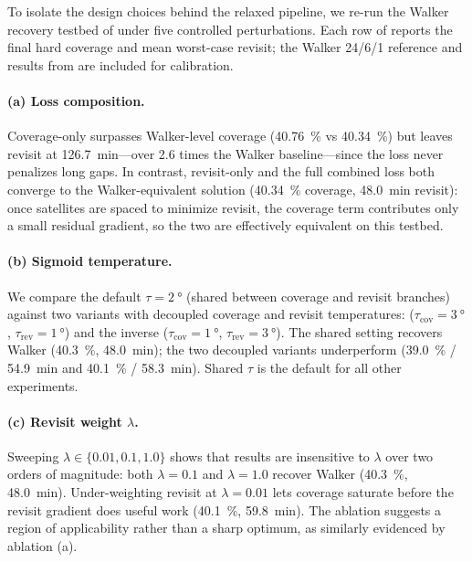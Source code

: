To isolate the design choices behind the relaxed pipeline, we re-run the Walker recovery testbed of  under five controlled perturbations. Each row of  reports the final hard coverage and mean worst-case revisit; the Walker 24/6/1 reference and results from  are included for calibration.

\begin{table}[!htb]
\centering
\caption{Design-choice ablations on the Walker recovery testbed (, 24 satellites, 1000 iterations, hard metrics evaluated at the final step). Default settings (used elsewhere unless ablated) are $\lambda = 0.1$, $\tau_{\text{cov}} = \tau_{\text{rev}} = \SI{2}{\degree}$, $\beta = \SI{10}{\minute}$.}
\label{tab:ablations}

\end{table}

\paragraph{(a) Loss composition.}
Coverage-only surpasses Walker-level coverage (\SI{40.76}{\percent} vs \SI{40.34}{\percent}) but leaves revisit at \SI{126.7}{\minute}---over 2.6 times the Walker baseline---since the loss never penalizes long gaps.
In contrast, revisit-only and the full combined loss both converge to the Walker-equivalent solution (\SI{40.34}{\percent} coverage, \SI{48.0}{\minute} revisit): once satellites are spaced to minimize revisit, the coverage term contributes only a small residual gradient, so the two are effectively equivalent on this testbed.

\paragraph{(b) Sigmoid temperature.}
We compare the default $\tau = \SI{2}{\degree}$ (shared between coverage and revisit branches) against two variants with decoupled coverage and revisit temperatures: ($\tau_{\text{cov}} = \SI{3}{\degree}$, $\tau_{\text{rev}} = \SI{1}{\degree}$) and the inverse ($\tau_{\text{cov}} = \SI{1}{\degree}$, $\tau_{\text{rev}} = \SI{3}{\degree}$). The shared setting recovers Walker (\SI{40.3}{\percent}, \SI{48.0}{\minute}); the two decoupled variants underperform (\SI{39.0}{\percent} / \SI{54.9}{\minute} and \SI{40.1}{\percent} / \SI{58.3}{\minute}). Shared $\tau$ is the default for all other experiments.

\paragraph{(c) Revisit weight $\lambda$.}
Sweeping $\lambda \in \{0.01, 0.1, 1.0\}$ shows that results are insensitive to $\lambda$ over two orders of magnitude: both $\lambda = 0.1$ and $\lambda = 1.0$ recover Walker (\SI{40.3}{\percent}, \SI{48.0}{\minute}).
Under-weighting revisit at $\lambda = 0.01$ lets coverage saturate before the revisit gradient does useful work (\SI{40.1}{\percent}, \SI{59.8}{\minute}). The ablation suggests a region of applicability rather than a sharp optimum, as similarly evidenced by ablation (a).

